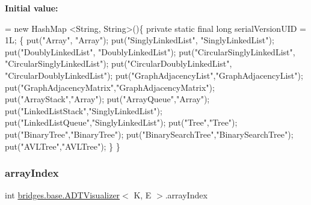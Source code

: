 {\bfseries Initial value\+:}
\begin{DoxyCode}
=
            \textcolor{keyword}{new} HashMap <String, String>()\{
                \textcolor{keyword}{private} \textcolor{keyword}{static} \textcolor{keyword}{final} \textcolor{keywordtype}{long} serialVersionUID = 1L;
                \{
                    put(\textcolor{stringliteral}{"Array"}, \textcolor{stringliteral}{"Array"});
                    put(\textcolor{stringliteral}{"SinglyLinkedList"}, \textcolor{stringliteral}{"SinglyLinkedList"});
                    put(\textcolor{stringliteral}{"DoublyLinkedList"}, \textcolor{stringliteral}{"DoublyLinkedList"});
                    put(\textcolor{stringliteral}{"CircularSinglyLinkedList"}, \textcolor{stringliteral}{"CircularSinglyLinkedList"});
                    put(\textcolor{stringliteral}{"CircularDoublyLinkedList"}, \textcolor{stringliteral}{"CircularDoublyLinkedList"});
                    put(\textcolor{stringliteral}{"GraphAdjacencyList"},\textcolor{stringliteral}{"GraphAdjacencyList"});
                    put(\textcolor{stringliteral}{"GraphAdjacencyMatrix"},\textcolor{stringliteral}{"GraphAdjacencyMatrix"});
                    put(\textcolor{stringliteral}{"ArrayStack"},\textcolor{stringliteral}{"Array"});
                    put(\textcolor{stringliteral}{"ArrayQueue"},\textcolor{stringliteral}{"Array"});
                    put(\textcolor{stringliteral}{"LinkedListStack"},\textcolor{stringliteral}{"SinglyLinkedList"});
                    put(\textcolor{stringliteral}{"LinkedListQueue"},\textcolor{stringliteral}{"SinglyLinkedList"});
                    put(\textcolor{stringliteral}{"Tree"},\textcolor{stringliteral}{"Tree"});
                    put(\textcolor{stringliteral}{"BinaryTree"},\textcolor{stringliteral}{"BinaryTree"});
                    put(\textcolor{stringliteral}{"BinarySearchTree"},\textcolor{stringliteral}{"BinarySearchTree"});
                    put(\textcolor{stringliteral}{"AVLTree"},\textcolor{stringliteral}{"AVLTree"});
                \}
            \}
\end{DoxyCode}
\hypertarget{classbridges_1_1base_1_1_a_d_t_visualizer_a6304c4131e3e7eb5953402368b0e9e3c}{}\label{classbridges_1_1base_1_1_a_d_t_visualizer_a6304c4131e3e7eb5953402368b0e9e3c} 
\subsubsection{\texorpdfstring{array\+Index}{arrayIndex}}
{\footnotesize\ttfamily int \hyperlink{classbridges_1_1base_1_1_a_d_t_visualizer}{bridges.\+base.\+A\+D\+T\+Visualizer}$<$ K, E $>$.array\+Index\hspace{0.3cm}{\ttfamily [protected]}}

